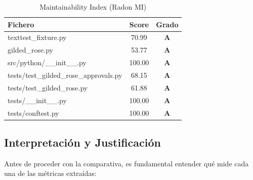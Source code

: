 \documentclass{article}
\newcommand{\good}[1]{\textbf{\textcolor{metGood}{#1}}}
\begin{document}
\begin{table}[H]
    \centering
    \small
    \begin{tabular}{lcc}
        \toprule
        \textbf{Fichero}                       & \textbf{Score} & \textbf{Grado} \\
        \midrule
        texttest\_fixture.py                   & 70.99          & \good{A}       \\
        gilded\_rose.py                        & 53.77          & \good{A}       \\
        src/python/\_\_init\_\_.py             & 100.00         & \good{A}       \\
        tests/test\_gilded\_rose\_approvals.py & 68.15          & \good{A}       \\
        tests/test\_gilded\_rose.py            & 61.88          & \good{A}       \\
        tests/\_\_init\_\_.py                  & 100.00         & \good{A}       \\
        tests/conftest.py                      & 100.00         & \good{A}       \\
        \bottomrule
    \end{tabular}
    \caption{Maintainability Index (Radon MI)}
    \label{tab:radon_mi}
\end{table}

\subsection{Interpretación y Justificación}
Antes de proceder con la comparativa, es fundamental entender qué mide cada una de las métricas extraídas:
\end{document}
